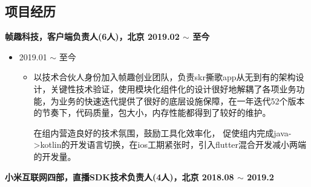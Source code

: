 \documentclass[line,margin,UTF8]{res}
\begin{document}
 
\address{15718887533}

\begin{resume}
 


\section{项目经历} 
{\bf 帧趣科技，客户端负责人(6人)，北京 \hfill  2019.02 $\sim$ 至今}
 \vspace{3pt}

  \begin{itemize}
 \item {} 2019.01 $\sim$ 至今
 	\vspace{-3pt}
 	\begin{itemize}
 		\item
 		以技术合伙人身份加入帧趣创业团队，负责skr撕歌app从无到有的架构设计，关键性技术验证，使用模块化组件化的设计很好地解耦了各项业务功能，为业务的快速迭代提供了很好的底层设施保障，在一年迭代52个版本的节奏下，代码质量，包大小，内存性能都得到了较好的维护。

		在组内营造良好的技术氛围，鼓励工具化效率化，
		促使组内完成java->kotlin的开发语言切换，在ios工期紧张时，引入flutter混合开发减小两端的开发量。

 \end{itemize}
 \end{itemize}

{\bf 小米互联网四部，直播SDK技术负责人(4人)，北京 \hfill  2018.08 $\sim$ 2019.2}
 \vspace{3pt}


\end{resume}
\end{document}
